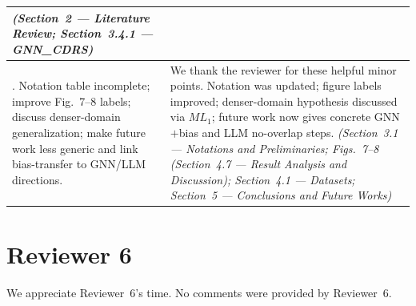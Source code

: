 \documentclass[11pt,a4paper]{article}
\begin{document}
{\begin{longtable}{@{}>{\raggedright\arraybackslash}p{}|>{\raggedright\arraybackslash}p{}@{}}
\textit{(Section~2 --- Literature Review; Section~3.4.1 --- GNN\_CDRS)} \\
\midrule
6. Notation table incomplete; improve Fig.~7--8 labels; discuss denser-domain generalization; make future work less generic and link bias-transfer to GNN/LLM directions.
&
We thank the reviewer for these helpful minor points. Notation was updated; figure labels improved; denser-domain hypothesis discussed via $ML_1$; future work now gives concrete GNN$+$bias and LLM no-overlap steps.
\textit{(Section~3.1 --- Notations and Preliminaries; Figs.~7--8 (Section~4.7 --- Result Analysis and Discussion); Section~4.1 --- Datasets; Section~5 --- Conclusions and Future Works)} \\
\bottomrule
\end{longtable}
}

\section*{Reviewer 6}
\noindent We appreciate Reviewer~6's time. No comments were provided by Reviewer~6.

\end{document}
